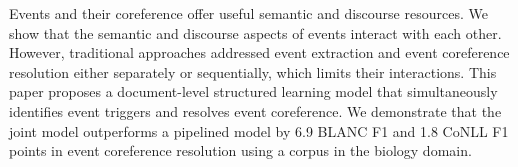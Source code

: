 Events and their coreference offer useful semantic and discourse resources. We show that the semantic and discourse aspects of events interact with each other. However, traditional approaches addressed event extraction and event coreference resolution either separately or sequentially, which limits their interactions. This paper proposes a document-level structured learning model that simultaneously identifies event triggers and resolves event coreference. We demonstrate that the joint model outperforms a pipelined model by 6.9 BLANC F1 and 1.8 CoNLL F1 points in event coreference resolution using a corpus in the biology domain.
